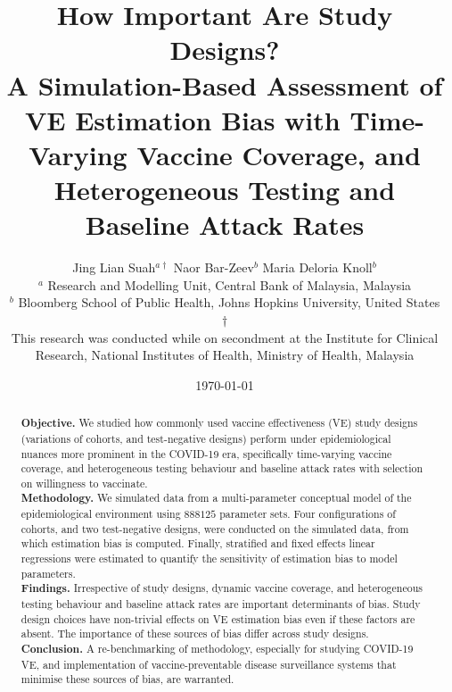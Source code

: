 \documentclass[12pt]{article}
\title{\textbf{How Important Are Study Designs?} \\ \large A Simulation-Based Assessment of VE Estimation Bias with Time-Varying Vaccine Coverage, and Heterogeneous Testing and Baseline Attack Rates}
\author{Jing Lian Suah${}^{a\dagger}$ \qquad Naor Bar-Zeev${}^b$ \qquad Maria Deloria Knoll${}^b$ \\ \small ${}^a$ Research and Modelling Unit, Central Bank of Malaysia, Malaysia \\ \small ${}^b$ Bloomberg School of Public Health, Johns Hopkins University, United States \\ \footnotesize $\dagger$ \parbox{\linewidth}{\centering This research was conducted while on secondment at the Institute for Clinical Research, National Institutes of Health, Ministry of Health, Malaysia}}
\date{\today}
\begin{document}
\begin{titlepage}
	\maketitle
	\begin{abstract}
		\noindent
		\textbf{Objective.} We studied how commonly used vaccine effectiveness (VE) study designs (variations of cohorts, and test-negative designs) perform under epidemiological nuances more prominent in the COVID-19 era, specifically time-varying vaccine coverage, and heterogeneous testing behaviour and baseline attack rates with selection on willingness to vaccinate.\\
		\textbf{Methodology.} We simulated data from a multi-parameter conceptual model of the epidemiological environment using $888125$ parameter sets. Four configurations of cohorts, and two test-negative designs, were conducted on the simulated data, from which estimation bias is computed. Finally, stratified and fixed effects linear regressions were estimated to quantify the sensitivity of estimation bias to model parameters.\\
		\textbf{Findings.} Irrespective of study designs, dynamic vaccine coverage, and heterogeneous testing behaviour and baseline attack rates are important determinants of bias. Study design choices have non-trivial effects on VE estimation bias even if these factors are absent. The importance of these sources of bias differ across study designs. \\
		\textbf{Conclusion.} A re-benchmarking of methodology, especially for studying COVID-19 VE, and implementation of vaccine-preventable disease surveillance systems that minimise these sources of bias, are warranted.
	\end{abstract}
\end{titlepage}
\end{document}
